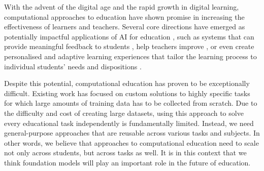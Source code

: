 With the advent of the digital age and the rapid growth in digital learning,
computational approaches to education have shown promise in increasing the effectiveness of learners and teachers. Several core directions have emerged as potentially impactful applications of AI for education \cite{woolf2013aied}, such as systems that can provide meaningful feedback to students \cite{malik2021generative}, help teachers improve \cite{jensen2020toward, demszky2021measuring, suresh2021using}, or even create personalised and adaptive learning experiences that tailor the learning process to individual students' needs and dispositions \cite{connor2019using}. 

Despite this potential, computational education has proven to be exceptionally difficult. Existing work has focused on custom solutions to highly specific tasks for which large amounts of training data has to be collected from scratch. Due to the difficulty and cost of creating large datasets, using this approach to solve every educational task independently is fundamentally limited.
Instead, we need general-purpose approaches that are reusable across various tasks and subjects.
In other words, we believe that approaches to computational education need to scale not only across students, but across tasks as well. It is in this context that we think foundation models will play an important role in the future of education.






